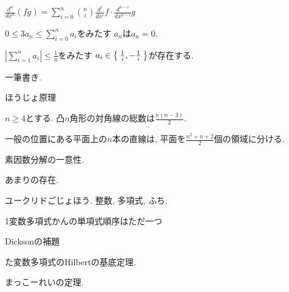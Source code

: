 \begin{prop}
$\frac{d^n}{dx^n}(fg)=\sum_{i=0}^n\binom{n}{i}\frac{d^i}{dx^i}f \cdot \frac{d^{n-i}}{dx^{n-i}}g$
\end{prop}




\begin{prop}
  $0\leq 3a_n\leq\sum_{i=0}^n a_i$をみたす
  $a_n$は$a_n=0$.
\end{prop}

\begin{prop}
  $|\sum_{i=1}^{n}a_i|\leq \frac{1}{n}$をみたす
  $a_i\in\Set{\frac{1}{i},-\frac{1}{i}}$が存在する.
\end{prop}

\begin{prop}
一筆書き.
\end{prop}

\begin{prop}
ほうじょ原理
\end{prop}

\begin{prop}
  $n\geq 4$とする.
  凸$n$角形の対角線の総数は$\frac{n(n-3)}{2}$.
\end{prop}

\begin{prop}
  一般の位置にある平面上の$n$本の直線は,
  平面を$\frac{n^2+n+2}{2}$個の領域に分ける.
\end{prop}

\begin{prop}
  素因数分解の一意性.
\end{prop}

\begin{prop}
  あまりの存在.
\end{prop}

\begin{prop}
  ユークリドごじょほう.  整数, 多項式, ふち.
\end{prop}

\begin{prop}
  1変数多項式かんの単項式順序はただ一つ
\end{prop}

\begin{prop}
  Dicksonの補題
\end{prop}

\begin{prop}
  た変数多項式のHilbertの基底定理.
\end{prop}

\begin{prop}
  まっこーれいの定理.
\end{prop}

